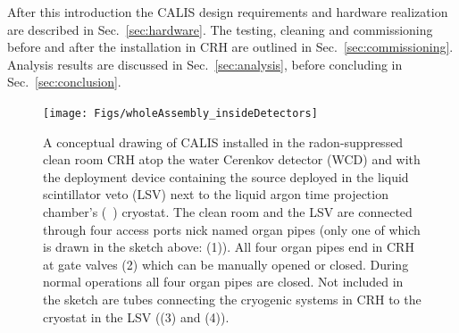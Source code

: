 After this introduction the CALIS design requirements and hardware realization are described in Sec.~\ref{sec:hardware}. The testing, cleaning and commissioning before and after the installation in CRH are outlined in Sec.~\ref{sec:commissioning}. Analysis results are discussed in Sec.~\ref{sec:analysis}, before concluding in Sec.~\ref{sec:conclusion}.

\begin{figure}[htbp]
 \centering
\texttt{[image: Figs/wholeAssembly\_insideDetectors]}
\caption{A conceptual drawing of CALIS installed in the radon-suppressed clean room CRH atop the water Cerenkov detector (WCD) and with the deployment device containing the source  %
deployed in the liquid scintillator veto (LSV) next to the liquid argon time projection chamber's (\lar\ \tpc) cryostat. The clean room and the LSV are connected through four %
access ports nick named organ pipes (only one of which is drawn in the sketch above: (1)). All four organ pipes end in CRH at gate valves (2) which can be manually opened or closed. During normal operations all four organ pipes are closed. Not included in the sketch are tubes connecting the cryogenic systems in CRH to the cryostat in the LSV ((3) and (4)).\label{fig:wholeAssembly_insideDetectors}}
\end{figure}

